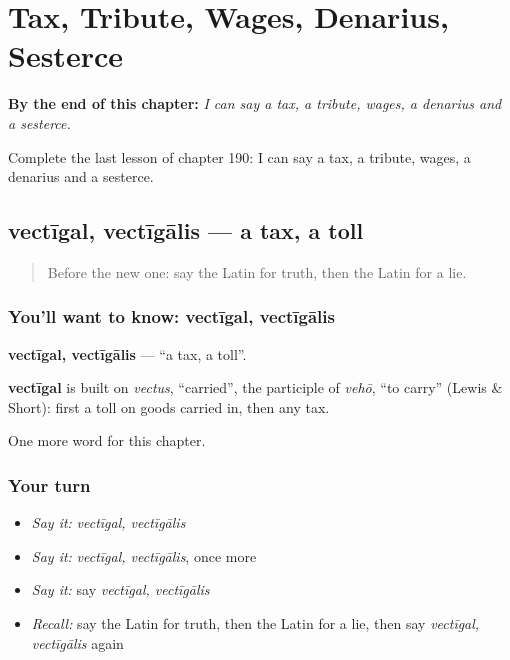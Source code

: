 
\chapter{Tax, Tribute, Wages, Denarius, Sesterce}
\label{ch:la-tax-tribute-wages-denarius-sesterce}

\begin{chapteropening}
\textbf{By the end of this chapter:} \emph{I can say a tax, a tribute, wages, a denarius and a sesterce.}

Complete the last lesson of chapter 190: I can say a tax, a tribute, wages, a denarius and a sesterce.
\end{chapteropening}

\section[vectīgal, vectīgālis]{vectīgal, vectīgālis — a tax, a toll}

\label{lesson:LA-C190-vectigal}



\begin{quote}
Before the new one: say the Latin for truth, then the Latin for a lie.
\end{quote}

\subsection*{You'll want to know: vectīgal, vectīgālis}
\textbf{vectīgal, vectīgālis} — \textquotedblleft{}a tax, a toll\textquotedblright{}.

\begin{cousinweb}
\textbf{vectīgal} is built on \emph{vectus}, \textquotedblleft{}carried\textquotedblright{}, the participle of \emph{vehō}, \textquotedblleft{}to carry\textquotedblright{} (Lewis \& Short): first a toll on goods carried in, then any tax.
\end{cousinweb}

\begin{grammarlens}[title={What you've built}]
One more word for this chapter.
\end{grammarlens}

\subsection*{Your turn}
\begin{itemize}
\raggedright
  \item \emph{Say it:} \emph{vectīgal, vectīgālis}
  \item \emph{Say it:} \emph{vectīgal, vectīgālis}, once more
  \item \emph{Say it:} say \emph{vectīgal, vectīgālis}
  \item \emph{Recall:} say the Latin for truth, then the Latin for a lie, then say \emph{vectīgal, vectīgālis} again
\end{itemize}

